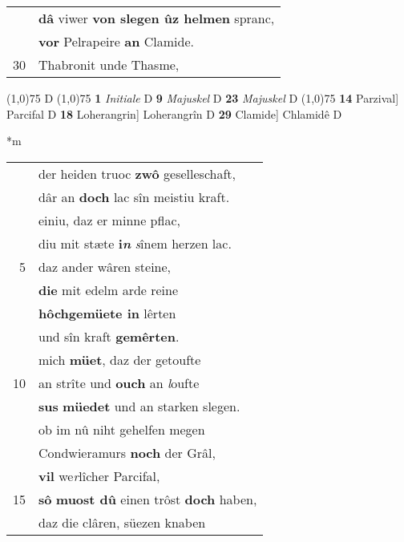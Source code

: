 \documentclass[8pt,a4paper,notitlepage]{article}
\begin{document}
\begin{table}[ht]
\begin{minipage}[t]{0.5\linewidth}
\begin{tabular}{rl}
 & \textbf{dâ} viwer \textbf{von slegen ûz helmen} spranc,\\ 
 & \textbf{vor} Pelrapeire \textbf{an} Clamide.\\ 
30 & Thabronit unde Thasme,\\ 
\end{tabular}
\scriptsize
\line(1,0){75} \newline
D \newline
\line(1,0){75} \newline
\textbf{1} \textit{Initiale} D  \textbf{9} \textit{Majuskel} D  \textbf{23} \textit{Majuskel} D  \newline
\line(1,0){75} \newline
\textbf{14} Parzival] Parcifal D \textbf{18} Loherangrin] Loherangrîn D \textbf{29} Clamide] Chlamidê D \newline
\end{minipage}
\hspace{0.5cm}
\begin{minipage}[t]{0.5\linewidth}
\small
\begin{center}*m
\end{center}
\begin{tabular}{rl}
 & der heiden truoc \textbf{zwô} geselleschaft,\\ 
 & dâr an \textbf{doch} lac sîn meistiu kraft.\\ 
 & einiu, daz er minne pflac,\\ 
 & diu mit stæte \textbf{i\textit{n}} \textit{s}înem herzen lac.\\ 
5 & daz ander wâren steine,\\ 
 & \textbf{die} mit edelm arde reine\\ 
 & \textbf{hôchgemüete in} lêrten\\ 
 & und sîn kraft \textbf{gemêrten}.\\ 
 & mich \textbf{müet}, daz der getoufte\\ 
10 & an strîte und \textbf{ouch} an \textit{l}oufte\\ 
 & \textbf{sus} \textbf{müedet} und an starken slegen.\\ 
 & ob im nû niht gehelfen megen\\ 
 & Condwieramurs \textbf{noch} der Grâl,\\ 
 & \textbf{vil} we\textit{r}lîcher Parcifal,\\ 
15 & \textbf{sô} \textbf{muost dû} einen trôst \textbf{doch} haben,\\ 
 & daz die clâren, süezen knaben\\ 

\end{tabular}
\end{minipage}
\end{table}
\end{document}

